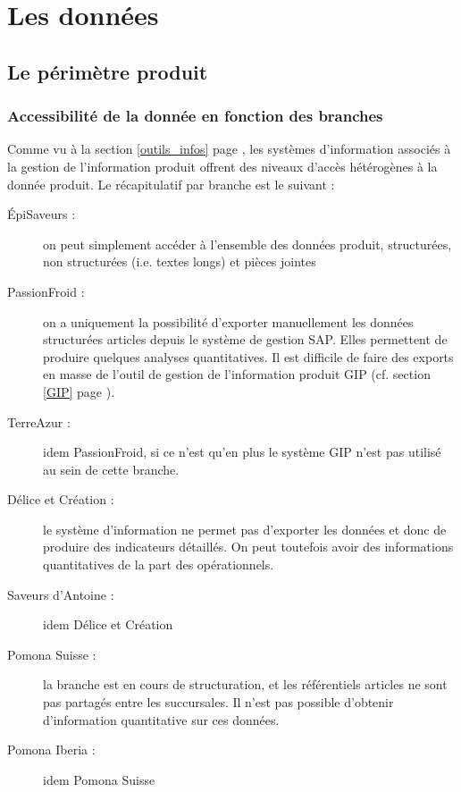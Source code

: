 \part{Les données}
    \chapter{Le périmètre produit}
    \label{perimetre_produit}
        \section{Accessibilité de la donnée en fonction des branches}

        Comme vu à la section \ref{outils_infos} page \pageref{outils_infos}, les systèmes d'information associés à la gestion de l'information produit offrent des niveaux d'accès hétérogènes à la donnée produit.
        Le récapitulatif par branche est le suivant : 
        \begin{description}
            \item[\'{E}piSaveurs :] on peut simplement accéder à l'ensemble des données produit, structurées, non structurées (i.e. textes longs) et pièces jointes
            \item[PassionFroid :] on a uniquement la possibilité d'exporter manuellement les données structurées articles depuis le système de gestion SAP.
            Elles permettent de produire quelques analyses quantitatives.
            Il est difficile de faire des exports en masse de l'outil de gestion de l'information produit GIP (cf. section \ref{GIP} page \pageref{GIP}).
            \item[TerreAzur :] idem PassionFroid, si ce n'est qu'en plus le système GIP n'est pas utilisé au sein de cette branche.
            \item[Délice et Création :] le système d'information ne permet pas d'exporter les données et donc de produire des indicateurs détaillés. On peut toutefois avoir des informations quantitatives de la part des opérationnels.
            \item[Saveurs d'Antoine :] idem Délice et Création
            \item[Pomona Suisse :] la branche est en cours de structuration, et les référentiels articles ne sont pas partagés entre les succursales. Il n'est pas possible d'obtenir d'information quantitative sur ces données.
            \item[Pomona Iberia :] idem Pomona Suisse
        \end{description}

